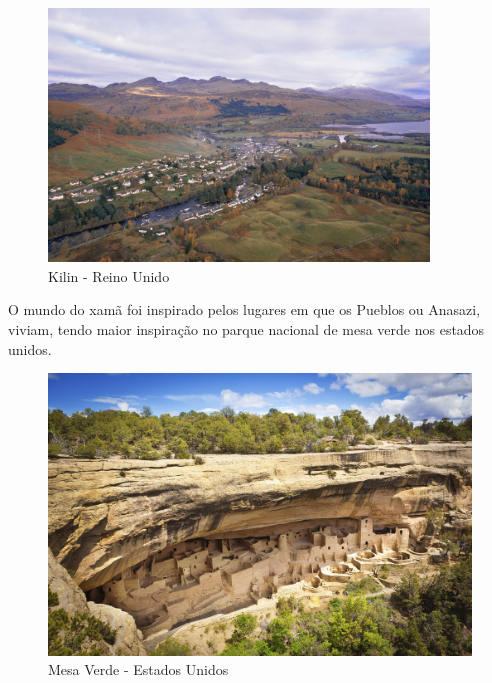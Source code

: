 \begin{figure}[htb]
    \caption{\label{fig_mundoBruxa}Kilin - Reino Unido}
    \begin{center}
        \includegraphics[width=0.9\textwidth]{imagens/kilin.jpg}
    \end{center}
\end{figure}

\clearpage

O mundo do xamã foi inspirado pelos lugares em que os Pueblos ou Anasazi, viviam, tendo maior inspiração no parque nacional de mesa verde nos estados unidos.


\begin{figure}[htb]
    \caption{\label{fig_mundoXaman}Mesa Verde - Estados Unidos}
    \begin{center}
        \includegraphics[width=\textwidth]{imagens/mesaverde.jpg}
    \end{center}
\end{figure}

